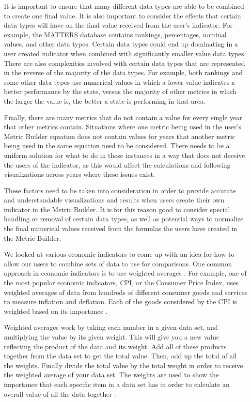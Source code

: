 		It is important to ensure that many different data types are able to be combined to create 
		one final value. It is also important to consider the effects that certain data types will 
		have on the final value received from the user's indicator. For example, the MATTERS database 
		contains rankings, percentages, nominal values, and other data types. Certain data types could 
		end up dominating in a user created indicator when combined with significantly smaller value 
		data types. There are also complexities involved with certain data types that are represented in 
		the reverse of the majority of the data types. For example, both rankings and some other data 
		types use numerical values in which a lower value indicates a better performance by the state, 
		versus the majority of other metrics in which the larger the value is, the better a state is 
		performing in that area. 

		Finally, there are many metrics that do not contain a value for every single year that other 
		metrics contain. Situations where one metric being used in the user's Metric Builder equation
		does not contain values for years that another metric being used in the same equation need to be 
		considered. There needs to be a uniform solution for what to do in these instances in a way that 
		does not deceive the users of the indicator, as this would affect the calculations and following 
		visualizations across years where these issues exist.

		These factors need to be taken into consideration in order to provide accurate and understandable 
		visualizations and results when users create their own indicator in the Metric Builder. It is for 
		this reason good to consider special handling or removal of certain data types, as well as potential 
		ways to normalize the final numerical values received from the formulas the users have created in 
		the Metric Builder.

		We looked at various economic indicators to come up with an idea for how to allow our users to 
		combine sets of data to use for comparisons. One common approach in economic indicators is to use 
		weighted averages \cite{weightedaverage}. For example, one of the most popular economic indicators, 
		CPI, or the Consumer Price Index, uses weighted averages of data from hundreds of different consumer 
		goods and services to measure inflation and deflation. Each of the goods considered by the CPI is 
		weighted based on its importance \cite{cpi}.

		Weighted averages work by taking each number in a given data set, and multiplying the value by 
		its given weight. This will give you a new value reflecting the product of the data and its weight. 
		Add all of these products together from the data set to get the total value. Then, add up the total 
		of all the weights. Finally divide the total value by the total weight in order to receive the weighted 
		average of your data set. The weights are used to show the importance that each specific item in a 
		data set has in order to calculate an overall value of all the data together \cite{economic}.
